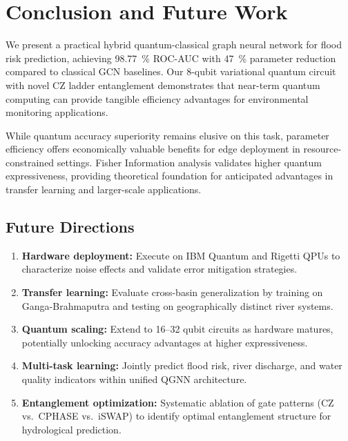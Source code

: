 \documentclass[conference]{IEEEtran}
\begin{document}
\section{Conclusion and Future Work}
\label{sec:conclusion}

We present a practical hybrid quantum-classical graph neural network for flood risk prediction, achieving \SI{98.77}{\percent} ROC-AUC with \SI{47}{\percent} parameter reduction compared to classical GCN baselines. Our 8-qubit variational quantum circuit with novel CZ ladder entanglement demonstrates that near-term quantum computing can provide tangible efficiency advantages for environmental monitoring applications.

While quantum accuracy superiority remains elusive on this task, parameter efficiency offers economically valuable benefits for edge deployment in resource-constrained settings. Fisher Information analysis validates higher quantum expressiveness, providing theoretical foundation for anticipated advantages in transfer learning and larger-scale applications.

\subsection{Future Directions}

\begin{enumerate}
\item \textbf{Hardware deployment:} Execute on IBM Quantum and Rigetti QPUs to characterize noise effects and validate error mitigation strategies.

\item \textbf{Transfer learning:} Evaluate cross-basin generalization by training on Ganga-Brahmaputra and testing on geographically distinct river systems.

\item \textbf{Quantum scaling:} Extend to 16--32 qubit circuits as hardware matures, potentially unlocking accuracy advantages at higher expressiveness.

\item \textbf{Multi-task learning:} Jointly predict flood risk, river discharge, and water quality indicators within unified QGNN architecture.

\item \textbf{Entanglement optimization:} Systematic ablation of gate patterns (CZ vs.\ CPHASE vs.\ iSWAP) to identify optimal entanglement structure for hydrological prediction.
\end{enumerate}
\end{document}
